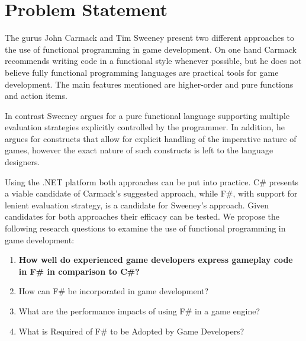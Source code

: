 \section{Problem Statement} \label{sec:problem_statement}
The gurus John Carmack and Tim Sweeney present two different approaches to the use of functional programming in game development. On one hand Carmack recommends writing code in a functional style whenever possible, but he does not believe fully functional programming languages are practical tools for game development. The main features mentioned are higher-order and pure functions and action items.

In contrast Sweeney argues for a pure functional language supporting multiple evaluation strategies explicitly controlled by the programmer. In addition, he argues for constructs that allow for explicit handling of the imperative nature of games, however the exact nature of such constructs is left to the language designers.

Using the .NET platform both approaches can be put into practice. C\# presents a viable candidate of Carmack's suggested approach, while F\#, with support for lenient evaluation strategy, is a candidate for Sweeney's approach. Given candidates for both approaches their efficacy can be tested. We propose the following research questions to examine the use of functional programming in game development:

\begin{center}
    \begin{enumerate}
        \item \textbf{How well do experienced game developers express gameplay code in F\# in comparison to C\#?}
        \item How can F\# be incorporated in game development?
        \item What are the performance impacts of using F\# in a game engine?
        \item What is Required of F\# to be Adopted by Game Developers?
    \end{enumerate}
\end{center}
